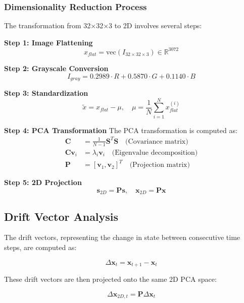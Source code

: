 \documentclass[11pt]{article}
\begin{document}
\subsubsection{Dimensionality Reduction Process}
The transformation from 32×32×3 to 2D involves several steps:

\textbf{Step 1: Image Flattening}
\begin{equation}
x_{flat} = \text{vec}(I_{32 \times 32 \times 3}) \in \mathbb{R}^{3072}
\end{equation}

\textbf{Step 2: Grayscale Conversion}
\begin{equation}
I_{gray} = 0.2989 \cdot R + 0.5870 \cdot G + 0.1140 \cdot B
\end{equation}

\textbf{Step 3: Standardization}
\begin{equation}
\tilde{x} = x_{flat} - \mu, \quad \mu = \frac{1}{N} \sum_{i=1}^{N} x_{flat}^{(i)}
\end{equation}

\textbf{Step 4: PCA Transformation}
The PCA transformation is computed as:
\begin{align}
\mathbf{C} &= \frac{1}{N-1} \mathbf{S}^T \mathbf{S} \quad \text{(Covariance matrix)} \\
\mathbf{C} \mathbf{v}_i &= \lambda_i \mathbf{v}_i \quad \text{(Eigenvalue decomposition)} \\
\mathbf{P} &= [\mathbf{v}_1, \mathbf{v}_2]^T \quad \text{(Projection matrix)}
\end{align}

\textbf{Step 5: 2D Projection}
\begin{equation}
\mathbf{s}_{2D} = \mathbf{P} \mathbf{s}, \quad \mathbf{x}_{2D} = \mathbf{P} \mathbf{x}
\end{equation}

\subsection{Drift Vector Analysis}
The drift vectors, representing the change in state between consecutive time steps, are computed as:

\begin{equation}
\Delta \mathbf{x}_t = \mathbf{x}_{t+1} - \mathbf{x}_t
\end{equation}

These drift vectors are then projected onto the same 2D PCA space:

\begin{equation}
\Delta \mathbf{x}_{2D,t} = \mathbf{P} \Delta \mathbf{x}_t
\end{equation}
\end{document}
